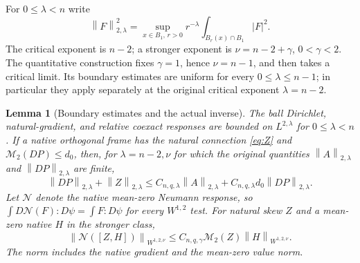 \documentclass[reqno,11pt]{amsart}
\numberwithin{equation}{section}
\newtheorem{lemma}[theorem]{Lemma}
\theoremstyle{definition}
\theoremstyle{remark}
\newcommand{\M}{\mathcal M}
\newcommand{\norm}[1]{\left\lVert#1\right\rVert}
\begin{document}
For $0\leq\lambda<n$ write
\[
 \norm F_{2,\lambda}^2=
 \sup_{x\in B_1,\,r>0}r^{-\lambda}
                         \int_{B_r(x)\cap B_1}|F|^2.
\]
The critical exponent is $n-2$; a stronger exponent is
$\nu=n-2+\gamma$, $0<\gamma<2$. The quantitative construction fixes
$\gamma=1$, hence $\nu=n-1$, and then takes a critical limit.
Its boundary estimates are uniform for every $0\leq\lambda\leq n-1$;
in particular they apply separately at the original critical exponent
$\lambda=n-2$.

\begin{lemma}[Boundary estimates and the actual inverse]\label{lem:gauge-operators}
The ball Dirichlet, natural-gradient, and relative coexact responses are
bounded on $L^{2,\lambda}$ for $0\leq\lambda<n$.
If a native orthogonal frame has the natural connection \eqref{eq:Z}
and $\M_2(DP)\leq d_0$, then, for $\lambda=n-2,\nu$ for which
the original quantities $\norm A_{2,\lambda}$ and
$\norm{DP}_{2,\lambda}$ are finite,
\begin{equation}\label{eq:absorption-before}
 \norm{DP}_{2,\lambda}+\norm Z_{2,\lambda}
 \leq C_{n,q,\lambda}\norm A_{2,\lambda}
       +C_{n,q,\lambda}d_0\norm{DP}_{2,\lambda}.
\end{equation}
Let $\mathcal N$ denote the native mean-zero Neumann response, so
$\int D\mathcal N(F):D\psi=\int F:D\psi$ for every $W^{1,2}$ test.
For natural skew $Z$ and a mean-zero native $H$ in the stronger class,
\begin{equation}\label{eq:linearized-neumann}
 \norm{\mathcal N([Z,H])}_{W^{1,2,\nu}}
 \leq C_{n,q,\gamma}\M_2(Z)\norm H_{W^{1,2,\nu}}.
\end{equation}
The norm includes the native gradient and the mean-zero value norm.
\end{lemma}
\end{document}
